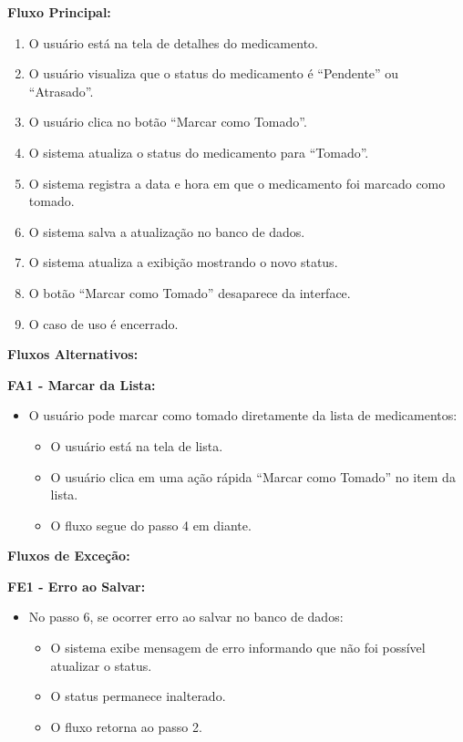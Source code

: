 \documentclass[12pt]{article}
\begin{document}
\textbf{Fluxo Principal:}
\begin{enumerate}
    \item O usuário está na tela de detalhes do medicamento.
    \item O usuário visualiza que o status do medicamento é ``Pendente'' ou ``Atrasado''.
    \item O usuário clica no botão ``Marcar como Tomado''.
    \item O sistema atualiza o status do medicamento para ``Tomado''.
    \item O sistema registra a data e hora em que o medicamento foi marcado como tomado.
    \item O sistema salva a atualização no banco de dados.
    \item O sistema atualiza a exibição mostrando o novo status.
    \item O botão ``Marcar como Tomado'' desaparece da interface.
    \item O caso de uso é encerrado.
\end{enumerate}

\textbf{Fluxos Alternativos:}

\textbf{FA1 - Marcar da Lista:}
\begin{itemize}
    \item O usuário pode marcar como tomado diretamente da lista de medicamentos:
    \begin{itemize}
        \item O usuário está na tela de lista.
        \item O usuário clica em uma ação rápida ``Marcar como Tomado'' no item da lista.
        \item O fluxo segue do passo 4 em diante.
    \end{itemize}
\end{itemize}

\textbf{Fluxos de Exceção:}

\textbf{FE1 - Erro ao Salvar:}
\begin{itemize}
    \item No passo 6, se ocorrer erro ao salvar no banco de dados:
    \begin{itemize}
        \item O sistema exibe mensagem de erro informando que não foi possível atualizar o status.
        \item O status permanece inalterado.
        \item O fluxo retorna ao passo 2.
    \end{itemize}
\end{itemize}
\end{document}
